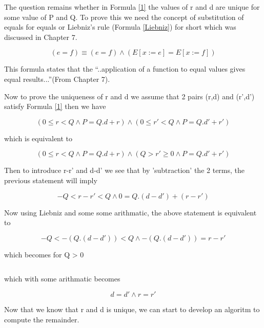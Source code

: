 \documentclass[10pt,a4paper]{article}
\begin{document}
The question remains whether in Formula \ref{1} the values of r and d are unique for some value of P and Q. To prove this we need the concept of substitution of equals for equals or Liebniz's rule (Formula \ref{Liebniz}) for short which was discussed in Chapter 7.

\begin{equation}
\label{Liebniz}
 (e=f)\equiv (e=f)\wedge (E[x:=e]=E[x:=f])
\end{equation}

This formula states that the ``..application of a function to equal values gives equal results...''(From Chapter 7).

Now to prove the uniqueness of r and d we assume that 2 pairs (r,d) and (r',d') satisfy Formula \ref{1} then we have

\begin{equation}
 (0\le r < Q \wedge P=Q.d+r)\wedge (0\le r' < Q \wedge P=Q.d'+r')
\end{equation}

which is equivalent to 

\begin{equation}
 (0\le r < Q \wedge P=Q.d+r)\wedge (Q > r' \ge 0 \wedge P=Q.d'+r')
\end{equation}

Then to introduce r-r'  and d-d' we see that by 'subtraction' the 2 terms, the previous statement will imply

\begin{equation}
 -Q<r-r'<Q \wedge 0 = Q.(d-d')+(r-r')
\end{equation}

Now using Liebniz and some some arithmatic, the above statement is equivalent to 

\begin{equation}
 -Q<-(Q.(d-d'))<Q \wedge -(Q.(d-d')) = r-r'
\end{equation}

which becomes for Q > 0

\begin{equation}
\end{equation}

which with some arithmatic becomes

\begin{equation}
 d=d' \wedge r=r'
\end{equation}

Now that we know that r and d is unique, we can start to develop an algoritm to compute the remainder.
\end{document}
